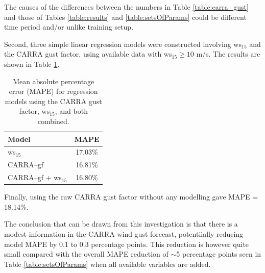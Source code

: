 The causes of the differences between the numbers in Table \ref{table:carra_gust} and those of Tables \ref{table:results} and \ref{table:setsOfParams} could be different time period and/or unlike training setup.

Second, three simple linear regression models were constructed involving ws$_{15}$ and the CARRA gust factor, using available data with ws$_{15} \geq 10$ m/s. The results are shown in Table \ref{table:carra_gust_regression}.

\begin{table}[h]
  \centering
  \caption[Regression MAPE with and without CARRA gust factor]{Mean absolute percentage error (MAPE) for regression models using the CARRA gust factor, ws$_{15}$, and both combined.}
  \label{table:carra_gust_regression}
  \begin{tabular}{lc}
    \toprule
    Model                         & MAPE   \\
    \midrule
    ws$_{15}$                     & 17.03\% \\
    CARRA–gf                      & 16.81\% \\
    CARRA–gf + ws$_{15}$          & 16.80\% \\
    \bottomrule
  \end{tabular}
\end{table}

Finally, using the raw CARRA gust factor without any modelling gave MAPE = 18.14\%.

The conclusion that can be drawn from this investigation is that there is a modest information in the CARRA wind gust forecast, potentiially reducing model MAPE by 0.1 to 0.3 percentage points. This reduction is however quite small compared with the overall MAPE reduction of $\sim$5 percentage points seen in Table \ref{table:setsOfParams} when all available variables are added.
